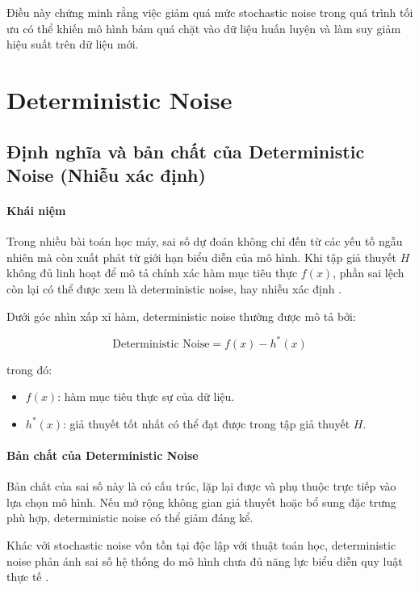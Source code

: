 Điều này chứng minh rằng việc giảm quá mức stochastic noise trong quá trình tối ưu có thể khiến mô hình bám quá chặt vào dữ liệu huấn luyện và làm suy giảm hiệu suất trên dữ liệu mới.

\section{Deterministic Noise}

\subsection{Định nghĩa và bản chất của Deterministic Noise (Nhiễu xác định)}

\paragraph{Khái niệm}

Trong nhiều bài toán học máy, sai số dự đoán không chỉ đến từ các yếu tố ngẫu nhiên mà còn xuất phát từ giới hạn biểu diễn của mô hình. Khi tập giả thuyết \(H\) không đủ linh hoạt để mô tả chính xác hàm mục tiêu thực \(f(x)\), phần sai lệch còn lại có thể được xem là deterministic noise, hay nhiễu xác định \cite{Geman_1992}.

Dưới góc nhìn xấp xỉ hàm, deterministic noise thường được mô tả bởi:

\begin{equation}
\text{Deterministic Noise} = f(x) - h^*(x)
\end{equation}

trong đó:

\begin{itemize}
    \item \(f(x)\): hàm mục tiêu thực sự của dữ liệu.
    \item \(h^*(x)\): giả thuyết tốt nhất có thể đạt được trong tập giả thuyết \(H\).
\end{itemize}

\paragraph{Bản chất của Deterministic Noise}

Bản chất của sai số này là có cấu trúc, lặp lại được và phụ thuộc trực tiếp vào lựa chọn mô hình. Nếu mở rộng không gian giả thuyết hoặc bổ sung đặc trưng phù hợp, deterministic noise có thể giảm đáng kể.

Khác với stochastic noise vốn tồn tại độc lập với thuật toán học, deterministic noise phản ánh sai số hệ thống do mô hình chưa đủ năng lực biểu diễn quy luật thực tế \cite{Domingos}.

